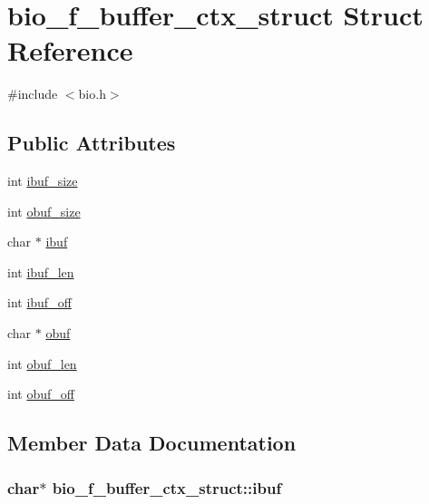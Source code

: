\hypertarget{structbio__f__buffer__ctx__struct}{}\section{bio\+\_\+f\+\_\+buffer\+\_\+ctx\+\_\+struct Struct Reference}
\label{structbio__f__buffer__ctx__struct}


{\ttfamily \#include $<$bio.\+h$>$}

\subsection*{Public Attributes}
\begin{DoxyCompactItemize}
\item 
int \hyperlink{structbio__f__buffer__ctx__struct_a2ef352eaf33c4d0414c494054d43a795}{ibuf\+\_\+size}
\item 
int \hyperlink{structbio__f__buffer__ctx__struct_ac054193e554cf659d638b00484ba3b07}{obuf\+\_\+size}
\item 
char $\ast$ \hyperlink{structbio__f__buffer__ctx__struct_a7d1c4d9f2365e5f41ae5dc3abef7a489}{ibuf}
\item 
int \hyperlink{structbio__f__buffer__ctx__struct_aeac265d0eb617edf027d714cb22bee72}{ibuf\+\_\+len}
\item 
int \hyperlink{structbio__f__buffer__ctx__struct_a4a05bfddcb84c53b98df8cf72d7626a0}{ibuf\+\_\+off}
\item 
char $\ast$ \hyperlink{structbio__f__buffer__ctx__struct_a3b756daa7e6784f12e178c2f73b6cbe4}{obuf}
\item 
int \hyperlink{structbio__f__buffer__ctx__struct_aa405c5c91239978aeabda2f9537db899}{obuf\+\_\+len}
\item 
int \hyperlink{structbio__f__buffer__ctx__struct_a33d8e302dcb91873af9ed993094e1960}{obuf\+\_\+off}
\end{DoxyCompactItemize}


\subsection{Member Data Documentation}
\subsubsection[{\texorpdfstring{ibuf}{ibuf}}]{\setlength{\rightskip}{0pt plus 5cm}char$\ast$ bio\+\_\+f\+\_\+buffer\+\_\+ctx\+\_\+struct\+::ibuf}\hypertarget{structbio__f__buffer__ctx__struct_a7d1c4d9f2365e5f41ae5dc3abef7a489}{}\label{structbio__f__buffer__ctx__struct_a7d1c4d9f2365e5f41ae5dc3abef7a489}
